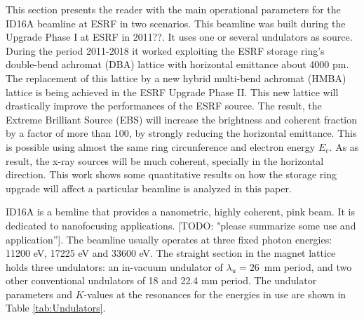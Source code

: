 \documentclass{iucr}              %
\newcommand{\todo}[1]{{\color{red}[TODO: "#1'']}}
\newcommand{\inred}[1]{{\color{red}#1}}
\begin{document}
This section presents the reader with the main operational parameters for the ID16A beamline at ESRF in two scenarios. This beamline was built during the Upgrade Phase I at ESRF in \inred{2011??}. It uses one or several undulators as source. During the period 2011-2018 it worked exploiting the ESRF storage ring’s double-bend achromat (DBA) lattice with horizontal emittance about 4000 pm. The replacement of this lattice by a new hybrid multi-bend achromat (HMBA) lattice is being achieved in the ESRF Upgrade Phase II. This new lattice will drastically improve the performances of the ESRF source. The result, the Extreme Brilliant Source (EBS) \cite{orangebook} will increase the brightness and coherent fraction by a factor of more than 100, by strongly reducing the horizontal emittance. This is possible using almost the same ring circunference and electron energy $E_e$. As as result, the x-ray sources will be much coherent, specially in the horizontal direction. This work shows some quantitative results on how the storage ring upgrade will affect a particular beamline is analyzed in this paper. 

ID16A \cite{ID16A} is a bemline that provides a nanometric, highly coherent, pink beam. It is dedicated to nanofocusing applications. \todo{please summarize some use and application}. The beamline usually operates at three fixed photon energies: 11200 eV, 17225 eV and 33600 eV. The straight section in the magnet lattice holds three undulators: an in-vacuum undulator of $\lambda_u=26$~mm period, and two other conventional undulators of 18 and 22.4 mm period. The undulator parameters and $K$-values at the resonances for the energies in use are shown in Table \ref{tab:Undulators}. 

\begin{table}\label{tab:Undulators}
\centering
\caption{Parameters of the undulators available at the ID16A beamline: period ($\lambda_u$), length ($L$), number of identical undulators ($N$) and deflection parameter ($K$) values for the three main photon energies in use. The valuse are shown for the two ESRF magnetic lattices: the old one (labelled ESRF, with $E_e = 6.04$ GeV) and the new one (EBS, with $E_e = 6.00$ GeV). $n$ is the emission harmonic in use for each particular photon energy.}

\end{table}
\end{document}
